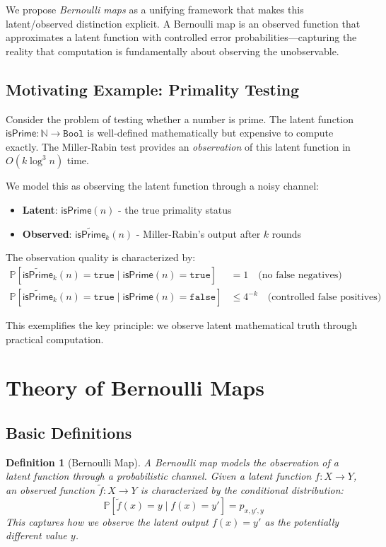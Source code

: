 \documentclass[11pt,final,hidelinks]{article}
\newtheorem{definition}[theorem]{Definition}
\newcommand{\obs}[1]{\widetilde{#1}}  %
\newcommand{\Type}[1]{\mathtt{#1}}
\newcommand{\ProbCond}[2]{\mathbb{P}\left[#1 \mid #2\right]}
\newcommand{\Bool}{\Type{Bool}}
\newcommand{\Nat}{\mathbb{N}}
\newcommand{\True}{\mathtt{true}}
\newcommand{\False}{\mathtt{false}}
\begin{document}
We propose \emph{Bernoulli maps} as a unifying framework that makes this latent/observed distinction explicit. A Bernoulli map is an observed function that approximates a latent function with controlled error probabilities—capturing the reality that computation is fundamentally about observing the unobservable.

\subsection{Motivating Example: Primality Testing}

Consider the problem of testing whether a number is prime. The latent function $\mathsf{isPrime} : \Nat \to \Bool$ is well-defined mathematically but expensive to compute exactly. The Miller-Rabin test \cite{miller1976,rabin1980} provides an \emph{observation} of this latent function in $O(k \log^3 n)$ time.

We model this as observing the latent function through a noisy channel:
\begin{itemize}
    \item \textbf{Latent}: $\mathsf{isPrime}(n)$ - the true primality status
    \item \textbf{Observed}: $\obs{\mathsf{isPrime}}_k(n)$ - Miller-Rabin's output after $k$ rounds
\end{itemize}

The observation quality is characterized by:
\begin{align}
\ProbCond{\obs{\mathsf{isPrime}}_k(n) = \True}{\mathsf{isPrime}(n) = \True} &= 1 \quad \text{(no false negatives)} \\
\ProbCond{\obs{\mathsf{isPrime}}_k(n) = \True}{\mathsf{isPrime}(n) = \False} &\leq 4^{-k} \quad \text{(controlled false positives)}
\end{align}

This exemplifies the key principle: we observe latent mathematical truth through practical computation.

\section{Theory of Bernoulli Maps}

\subsection{Basic Definitions}

\begin{definition}[Bernoulli Map]
A Bernoulli map models the observation of a latent function through a probabilistic channel. Given a latent function $f : X \to Y$, an observed function $\obs{f} : X \to Y$ is characterized by the conditional distribution:
\begin{equation}
\ProbCond{\obs{f}(x) = y}{f(x) = y'} = p_{x,y',y}
\end{equation}
This captures how we observe the latent output $f(x) = y'$ as the potentially different value $y$.
\end{definition}
\end{document}
